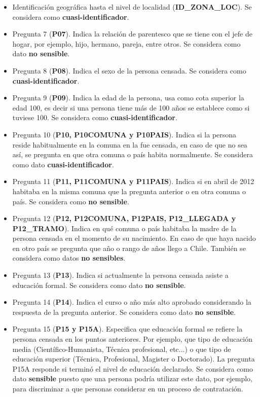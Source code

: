 \documentclass[informe]{upropuesta}
\begin{document}
\begin{itemize}
    \item Identificación geográfica hasta el nivel de localidad (\textbf{ID\_ZONA\_LOC}).
    Se considera como \textbf{cuasi-identificador}.
    \item Pregunta 7 (\textbf{P07}). Indica la relación de parentesco que se tiene con el jefe de hogar, por ejemplo, hijo, hermano, pareja, entre otros. Se considera como dato \textbf{no sensible}.
    \item Pregunta 8 (\textbf{P08}). Indica el sexo de la persona censada. Se considera como \textbf{cuasi-identificador}.
    \item Pregunta 9 (\textbf{P09}). Indica la edad de la persona, usa como cota superior la edad 100, es decir si una persona tiene más de 100 años se establece como si tuviese 100. Se considera como \textbf{cuasi-identificador}.
    \item Pregunta 10 (\textbf{P10, P10COMUNA y P10PAIS}). Indica si la persona reside habitualmente en la comuna en la fue censada, en caso de que no sea así, se pregunta en que otra comuna o país habita normalmente. Se considera como dato \textbf{cuasi-identificador}.
    \item Pregunta 11 (\textbf{P11, P11COMUNA y P11PAIS}). Indica si en abril de 2012 habitaba en la misma comuna que la pregunta anterior o en otra comuna o país. Se considera como \textbf{no sensible}.
    \item Pregunta 12 (\textbf{P12, P12COMUNA, P12PAIS, P12\_LLEGADA y P12\_TRAMO}). Indica en qué comuna o país habitaba la madre de la persona censada en el momento de su nacimiento. En caso de que haya nacido en otro país se pregunta que año o rango de años llego a Chile. También se considera como datos \textbf{no sensibles}.
    \item Pregunta 13 (\textbf{P13}). Indica si actualmente la persona censada asiste a educación formal. Se considera como dato \textbf{no sensible}.
    \item Pregunta 14 (\textbf{P14}). Indica el curso o año más alto aprobado considerando la respuesta de la pregunta anterior. Se considera como dato \textbf{no sensible}.
    \item Pregunta 15 (\textbf{P15 y P15A}). Especifica que educación formal se refiere la persona censada en los puntos anteriores. Por ejemplo, que tipo de educación media (Científico-Humanista, Técnica profesional, etc...) o que tipo de educación superior (Técnica, Profesional, Magister o Doctorado). La pregunta P15A responde si terminó el nivel de educación declarado. Se considera como dato \textbf{sensible} puesto que una persona podría utilizar este dato, por ejemplo, para discriminar a que personas considerar en un proceso de contratación.

\end{itemize}
\end{document}
